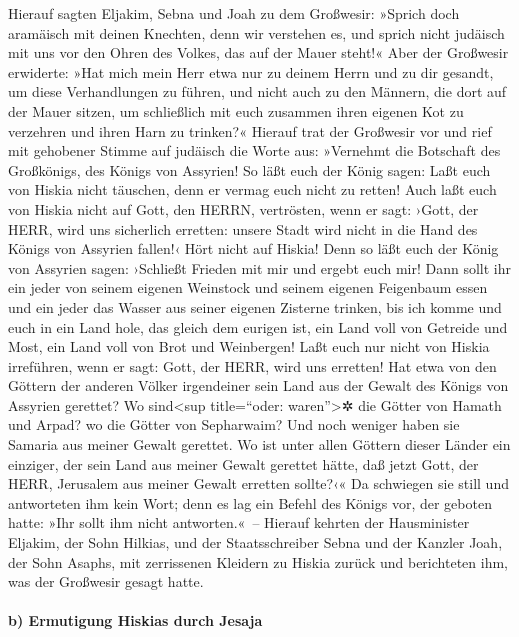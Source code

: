 Hierauf sagten Eljakim, Sebna und Joah zu dem Großwesir:
»Sprich doch aramäisch mit deinen Knechten, denn wir verstehen es, und
sprich nicht judäisch mit uns vor den Ohren des Volkes, das auf der
Mauer steht!« Aber der Großwesir erwiderte: »Hat mich
mein Herr etwa nur zu deinem Herrn und zu dir gesandt, um diese
Verhandlungen zu führen, und nicht auch zu den Männern, die dort auf der
Mauer sitzen, um schließlich mit euch zusammen ihren eigenen Kot zu
verzehren und ihren Harn zu trinken?« Hierauf trat der
Großwesir vor und rief mit gehobener Stimme auf judäisch die Worte aus:
»Vernehmt die Botschaft des Großkönigs, des Königs von Assyrien!
So läßt euch der König sagen: Laßt euch von Hiskia nicht
täuschen, denn er vermag euch nicht zu retten! Auch laßt
euch von Hiskia nicht auf Gott, den HERRN, vertrösten, wenn er sagt:
›Gott, der HERR, wird uns sicherlich erretten: unsere Stadt wird nicht
in die Hand des Königs von Assyrien fallen!‹ Hört nicht
auf Hiskia! Denn so läßt euch der König von Assyrien sagen: ›Schließt
Frieden mit mir und ergebt euch mir! Dann sollt ihr ein jeder von seinem
eigenen Weinstock und seinem eigenen Feigenbaum essen und ein jeder das
Wasser aus seiner eigenen Zisterne trinken, bis ich komme
und euch in ein Land hole, das gleich dem eurigen ist, ein Land voll von
Getreide und Most, ein Land voll von Brot und Weinbergen!
Laßt euch nur nicht von Hiskia irreführen, wenn er sagt:
Gott, der HERR, wird uns erretten! Hat etwa von den Göttern der anderen
Völker irgendeiner sein Land aus der Gewalt des Königs von Assyrien
gerettet? Wo sind\textless sup title=``oder:
waren''\textgreater✲ die Götter von Hamath und Arpad? wo die Götter von
Sepharwaim? Und noch weniger haben sie Samaria aus meiner Gewalt
gerettet. Wo ist unter allen Göttern dieser Länder ein
einziger, der sein Land aus meiner Gewalt gerettet hätte, daß jetzt
Gott, der HERR, Jerusalem aus meiner Gewalt erretten sollte?‹«
Da schwiegen sie still und antworteten ihm kein Wort;
denn es lag ein Befehl des Königs vor, der geboten hatte: »Ihr sollt ihm
nicht antworten.«~-- Hierauf kehrten der Hausminister
Eljakim, der Sohn Hilkias, und der Staatsschreiber Sebna und der Kanzler
Joah, der Sohn Asaphs, mit zerrissenen Kleidern zu Hiskia zurück und
berichteten ihm, was der Großwesir gesagt hatte.

\hypertarget{b-ermutigung-hiskias-durch-jesaja}{%
\paragraph{b) Ermutigung Hiskias durch
Jesaja}\label{b-ermutigung-hiskias-durch-jesaja}}

